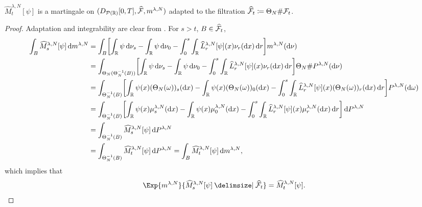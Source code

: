 \documentclass{article}
\begin{document}
\begin{corollary}\label{cor:hat-M-mart}
    $\widehat{M}_t^{\lambda, N}[\psi]$ is a martingale on $(D_{\mathcal{P}(\mathbb{R})}[0,T], \widehat{\mathcal{F}}, m^{\lambda,N})$ adapted to the filtration $\widehat{\mathcal{F}}_t \coloneqq \Theta_N \# \mathcal{F}_t$.
\end{corollary}
\begin{proof}
    Adaptation and integrability are clear from .
    For $s > t$, $B \in \widehat{\mathcal{F}}_t$,
    \begin{equation}
    \begin{split}
        \int_B \widehat{M}_{s}^{\lambda, N}[\psi] \odif{\lawmu^{\lambda,N}}
        &= \int_B \sbr*{ \int_\potspace \psi \odif{\nu_s} - \int_\potspace \psi \odif{\nu_0} - \int_0^s \int_\potspace \widehat{L}_r^{\lambda, N} [\psi](x) \nu_{r}(\odif{x}) \odif{r} } \lawmu^{\lambda,N} (\odif{\nu}) \\
        &= \int_{\Theta_N(\Theta_N^{-1}(B))} \sbr*{ \int_\potspace \psi \odif{\nu_s} - \int_\potspace \psi \odif{\nu_0} - \int_0^s \int_\potspace \widehat{L}_r^{\lambda, N} [\psi](x) \nu_{r}(\odif{x}) \odif{r} } \Theta_N \# P^{\lambda, N} (\odif{\nu}) \\
        &= \int_{\Theta_N^{-1}(B)} \sbr*{ \int_\potspace \psi(x) (\Theta_N(\omega))_s(\odif{x}) - \int_\potspace \psi(x) (\Theta_N(\omega))_0(\odif{x}) - \int_0^s \int_\potspace \widehat{L}_r^{\lambda, N} [\psi](x) (\Theta_N(\omega))_{r}(\odif{x}) \odif{r} } P^{\lambda, N} (\odif{\omega}) \\
        &= \int_{\Theta_N^{-1}(B)} \sbr*{ \int_\potspace \psi(x) \mu_s^{\lambda,N}(\odif{x}) - \int_\potspace \psi(x) \mu_0^{\lambda,N}(\odif{x}) - \int_0^s \int_\potspace \widehat{L}_r^{\lambda, N} [\psi](x) \mu_{r}^{\lambda,N}(\odif{x}) \odif{r} } \odif{P^{\lambda, N}} \\
        &= \int_{\Theta_N^{-1}(B)} \widehat{M}_s^{\lambda, N}[\psi] \odif{P^{\lambda, N}} \\
        &= \int_{\Theta_N^{-1}(B)} \widehat{M}_t^{\lambda, N}[\psi] \odif{P^{\lambda, N}}
        = \int_B \widehat{M}_t^{\lambda, N}[\psi] \odif{\lawmu^{\lambda,N}},
    \end{split}
    \end{equation}
    which implies that
    \begin{equation}
        \Exp{\lawmu^{\lambda,N}}{\widehat{M}_{s}^{\lambda, N}[\psi] \given \widehat{\cF}_t} = \widehat{M}_t^{\lambda, N}[\psi].
    \end{equation}
\end{proof}
\end{document}
